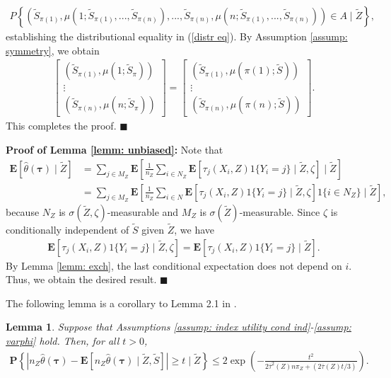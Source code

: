 \documentclass[12pt, fullpage]{amsart}
\newtheorem{lemma}{Lemma}[section]
\theoremstyle{definition}
\theoremstyle{definition}
\theoremstyle{definition}
\begin{document}
\begin{bibunit}[econometrica]
\begin{align*}
	P\left\{ (\tilde S_{\pi(1)},\mu(1; \tilde S_{\pi(1)},...,\tilde S_{\pi(n)}),...,\tilde S_{\pi(n)},\mu(n; \tilde S_{\pi(1)},...,\tilde S_{\pi(n)})) \in A \mid \tilde Z \right\},
\end{align*}
establishing the distributional equality in (\ref{distr eq}). By Assumption \ref{assump: symmetry}, we obtain
\begin{align}
	\label{eq2}
	\begin{bmatrix}
		(\tilde S_{\pi(1)},\mu(1;\tilde S_\pi)) \\
		\vdots \\
		(\tilde S_{\pi(n)},\mu(n;\tilde S_\pi))
	\end{bmatrix}
	= \begin{bmatrix}
		(\tilde S_{\pi(1)},\mu(\pi(1);\tilde S)) \\
		\vdots \\
		(\tilde S_{\pi(n)},\mu(\pi(n);\tilde S))
	\end{bmatrix}
	.
\end{align}
This completes the proof. $\blacksquare$\medskip

\noindent \textbf{Proof of Lemma \ref{lemm: unbiased}: } Note that 
\begin{align*}
    \mathbf{E}\left[ \hat \theta(\boldsymbol{\tau}) \mid \tilde Z \right] &= \sum_{j \in M_Z} \mathbf{E}\left[ \frac{1}{n_Z} \sum_{i \in N_Z} \mathbf{E}[\tau_j(X_i,Z) 1\{Y_i = j\} \mid \tilde Z, \zeta] \mid \tilde Z \right]\\
    &= \sum_{j \in M_Z} \mathbf{E}\left[ \frac{1}{n_Z} \sum_{i \in N} \mathbf{E}[\tau_j(X_i,Z) 1\{Y_i = j\} \mid \tilde Z, \zeta] 1\{ i \in N_Z \} \mid \tilde Z \right],
\end{align*}
because $N_Z$ is $\sigma(\tilde Z,\zeta)$-measurable and $M_Z$ is $\sigma(\tilde Z)$-measurable. Since $\zeta$ is conditionally independent of $\tilde S$ given $\tilde Z$, we have 
\begin{align*}
    \mathbf{E}[\tau_j(X_i,Z) 1\{Y_i = j\} \mid \tilde Z, \zeta] = \mathbf{E}[\tau_j(X_i,Z) 1\{Y_i = j\} \mid \tilde Z].
\end{align*}
By Lemma \ref{lemm: exch}, the last conditional expectation does not depend on $i$. Thus, we obtain the desired result. $\blacksquare$\medskip

The following lemma is a corollary to Lemma 2.1 in \cite{Chung/Lu:AC:2002}.

\begin{lemma}\label{lemm:conc_ineq2} Suppose that Assumptions \ref{assump: index utility cond ind}-\ref{assump: varphi} hold. Then, for all $t > 0$,
	\begin{align}
		\label{ineq1}
		\mathbf{P}\left\{ \left| n_Z \hat \theta(\boldsymbol{\tau}) - \mathbf{E}\left[ n_Z \hat \theta(\boldsymbol{\tau}) \mid \tilde Z, \tilde S \right] \right| \ge t \mid \tilde Z\right\} \le 2 \exp\left(-\frac{ t^2}{\displaystyle 2 \overline \tau^2(Z) n \pi_Z + \left(2 \overline \tau(Z) t/3 \right)}\right).
	\end{align}
\end{lemma}


\end{bibunit}
\end{document}
